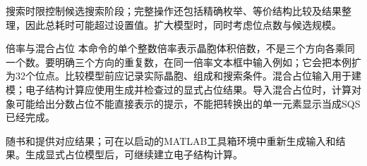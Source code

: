 搜索时限控制候选搜索阶段；完整操作还包括精确枚举、等价结构比较及结果整理，因此总耗时可能超过设置值。扩大模型时，同时考虑位点数与候选规模。

\begin{notebox}{倍率与混合占位}
本命令的单个整数倍率表示晶胞体积倍数，不是三个方向各乘同一个数。要明确三个方向的重复数，在同一倍率文本框中输入例如；它会把本例扩为32个位点。比较模型前应记录实际晶胞、组成和搜索条件。混合占位输入用于建模；电子结构计算应使用生成并检查过的显式占位结果。导入混合占位时，计算对象可能给出分数占位不能直接表示的提示，不能把转换出的单一元素显示当成SQS已经完成。
\end{notebox}

随书和提供对应结果；可在以启动的MATLAB\regmark{}工具箱环境中重新生成输入和结果。生成显式占位模型后，可继续建立电子结构计算。
